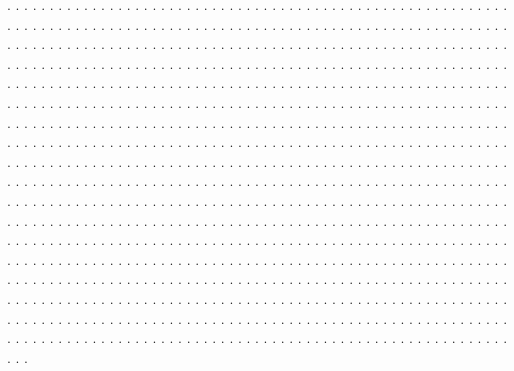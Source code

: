 \documentclass[twocolumn]{revtex4}
\begin{document}
. . . . . . . . . . . . . . . . . . . . . . . . .
. . . . . . . . . . . . . . . . . . . . . . . . . . . . . . . . . . . . . . . .
. . . . . . . . . . . . . . . . . . . . . . . . . . . . . . . . . . . . . . . .
. . . . . . . . . . . . . . . . . . . . . . . . . . . . . . . . . . . . . . . .
. . . . . . . . . . . . . . . . . . . . . . . . . . . . . . . . . . . . . . . .
. . . . . . . . . . . . . . . . . . . . . . . . . . . . . . . . . . . . . . . .
. . . . . . . . . . . . . . . . . . . . . . . . . . . . . . . . . . . . . . . .
. . . . . . . . . . . . . . . . . . . . . . . . . . . . . . . . . . . . . . . .
. . . . . . . . . . . . . . . . . . . . . . . . . . . . . . . . . . . . . . . .
. . . . . . . . . . . . . . . . . . . . . . . . . . . . . . . . . . . . . . . .
. . . . . . . . . . . . . . . . . . . . . . . . . . . . . . . . . . . . . . . .
. . . . . . . . . . . . . . . . . . . . . . . . . . . . . . . . . . . . . . . .
. . . . . . . . . . . . . . . . . . . . . . . . . . . . . . . . . . . . . . . .
. . . . . . . . . . . . . . . . . . . . . . . . . . . . . . . . . . . . . . . .
. . . . . . . . . . . . . . . . . . . . . . . . . . . . . . . . . . . . . . . .
. . . . . . . . . . . . . . . . . . . . . . . . . . . . . . . . . . . . . . . .
. . . . . . . . . . . . . . . . . . . . . . . . . . . . . . . . . . . . . . . .
. . . . . . . . . . . . . . . . . . . . . . . . . . . . . . . . . . . . . . . .
. . . . . . . . . . . . . . . . . . . . . . . . . . . . . . . . . . . . . . . .
. . . . . . . . . . . . . . . . . . . . . . . . . . . . . . . . . . . . . . . .
. . . . . . . . . . . . . . . . . . . . . . . . . . . . . . . . . . . . . . . .
. . . . . . . . . . . . . . . . . . . . . . . . . . . . . . . . . . . . . . . .
. . . . . . . . . . . . . . . . . . . . . . . . . . . . . . . . . . . . . . . .
. . . . . . . . . . . . . . . . . . . . . . . . . . . . . . . . . . . . . . . .
. . . . . . . . . . . . . . . . . . . . . . . . . . . . . . . . . . . . . . . .
. . . . . . . . . . . . . . . . . . . . . . . . . . . . . . . . . . . . . . . .
. . . . . . . . . . . . . . . . . . . . . . . . . . . . . . . . . . . . . . . .
\end{document}
